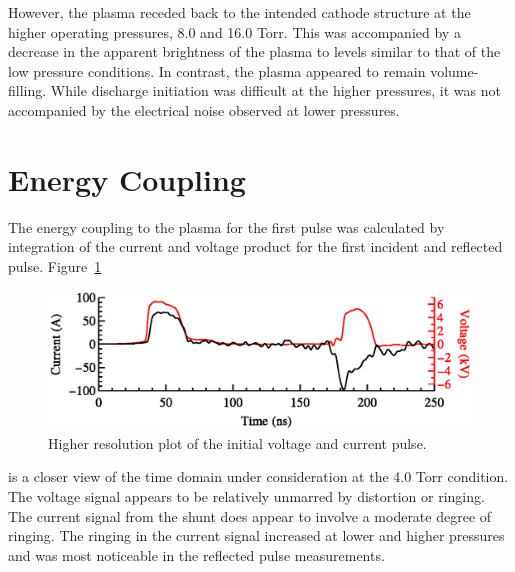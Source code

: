 However, the plasma receded back to the intended cathode structure at the higher
operating pressures, 8.0 and 16.0 Torr. This was accompanied by a decrease in
the apparent brightness of the plasma to levels similar to that of the low
pressure conditions. In contrast, the plasma appeared to remain volume-filling.
While discharge initiation was difficult at the higher pressures, it was not
accompanied by the electrical noise observed at lower pressures.

\section{Energy Coupling}

The energy coupling to the plasma for the first pulse was calculated by
integration of the current and voltage product for the first incident and
reflected pulse. Figure~\ref{fig:energy}
\begin{figure}
  \centering
  \includegraphics{./chapters/experiment/figures/energy.eps}
  \caption{Higher resolution plot of the initial voltage and current pulse.}
  \label{fig:energy}
\end{figure}
is a closer view of the time domain under consideration at the 4.0 Torr
condition. The voltage signal appears to be relatively unmarred by distortion or
ringing. The current signal from the shunt does appear to involve a moderate
degree of ringing. The ringing in the current signal increased at lower and
higher pressures and was most noticeable in the reflected pulse measurements.

